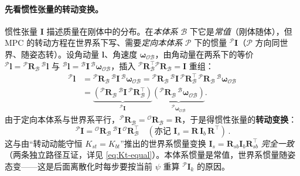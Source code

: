 \paragraph{先看惯性张量的转动变换。}
惯性张量 $\mathbf{I}$ 描述质量在刚体中的分布。在\emph{本体系} $\mathcal{B}$ 下它是\emph{常值}（刚体随体），但 MPC 的转动方程在世界系下写、需要\emph{定向本体系} $\mathcal{P}$ 下的惯量 ${}^{\mathcal{P}}\mathbf{I}$（$\mathcal{P}$ 方向同世界、随姿态转）。设角动量 $\boldsymbol{l}$、角速度 $\boldsymbol{\omega}_{\mathcal{OB}}$，由角动量在两系下的等价 ${}^{\mathcal{P}}\boldsymbol{l}={}^{\mathcal{P}}\mathbf{R}_{\mathcal{B}}\,{}^{\mathcal{B}}\boldsymbol{l}$ 与 ${}^{\mathcal{B}}\boldsymbol{l}={}^{\mathcal{B}}\mathbf{I}\,{}^{\mathcal{B}}\boldsymbol{\omega}_{\mathcal{OB}}$，插入 ${}^{\mathcal{P}}\mathbf{R}_{\mathcal{B}}^\top{}^{\mathcal{P}}\mathbf{R}_{\mathcal{B}}=\mathbf{I}$ 重组\cite{dicarlo2018cheetah}：
\begin{equation}
\begin{aligned}
  {}^{\mathcal{P}}\boldsymbol{l}
  &={}^{\mathcal{P}}\mathbf{R}_{\mathcal{B}}\,{}^{\mathcal{B}}\mathbf{I}\,{}^{\mathcal{B}}\boldsymbol{\omega}_{\mathcal{OB}}
  ={}^{\mathcal{P}}\mathbf{R}_{\mathcal{B}}\,{}^{\mathcal{B}}\mathbf{I}\,{}^{\mathcal{P}}\mathbf{R}_{\mathcal{B}}^\top\,{}^{\mathcal{P}}\mathbf{R}_{\mathcal{B}}\,{}^{\mathcal{B}}\boldsymbol{\omega}_{\mathcal{OB}}\\
  &=\underbrace{\left({}^{\mathcal{P}}\mathbf{R}_{\mathcal{B}}\,{}^{\mathcal{B}}\mathbf{I}\,{}^{\mathcal{P}}\mathbf{R}_{\mathcal{B}}^\top\right)}_{{}^{\mathcal{P}}\mathbf{I}}\underbrace{\left({}^{\mathcal{P}}\mathbf{R}_{\mathcal{B}}\,{}^{\mathcal{B}}\boldsymbol{\omega}_{\mathcal{OB}}\right)}_{{}^{\mathcal{P}}\boldsymbol{\omega}_{\mathcal{OB}}}.
\end{aligned}
\label{eq:angmom-transform}
\end{equation}
由于定向本体系与世界系平行，${}^{\mathcal{P}}\mathbf{R}_{\mathcal{B}}={}^{\mathcal{O}}\mathbf{R}_{\mathcal{B}}=\mathbf{R}$，于是得惯性张量的\textbf{转动变换}\cite{dicarlo2018cheetah,unitree2023quadruped}：
\begin{equation}
  \boxed{\,{}^{\mathcal{P}}\mathbf{I}={}^{\mathcal{O}}\mathbf{R}_{\mathcal{B}}\,{}^{\mathcal{B}}\mathbf{I}\,{}^{\mathcal{O}}\mathbf{R}_{\mathcal{B}}^\top
  \quad(\text{亦记 } \mathbf{I}_s=\mathbf{R}\,\mathbf{I}_b\,\mathbf{R}^\top)\,}.
  \label{eq:inertia-transform}
\end{equation}
这与由“转动动能守恒 $K_{st}=K_{bt}$”推出的世界系惯量变换 $\mathbf{I}_s=\mathbf{R}_{sb}\mathbf{I}_b\mathbf{R}_{sb}^\top$ \emph{完全一致}（两条独立路径互证，详见 \cref{eq:Kt-equal}）\cite{unitree2023quadruped}。本体系惯量是常值，世界系惯量随姿态变——这是后面离散化时每步要按当前 $\psi$ 重算 ${}^{\mathcal{P}}\mathbf{I}_k$ 的原因。

